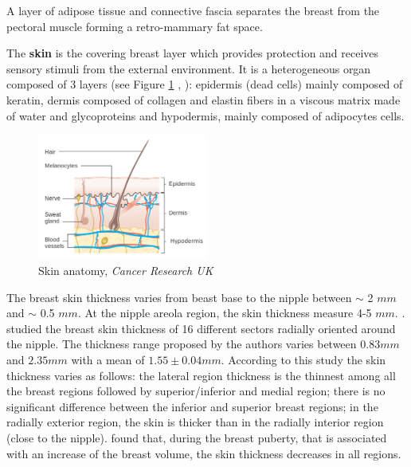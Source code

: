  A layer of adipose tissue and connective fascia separates the breast from the pectoral muscle forming a retro-mammary fat space.
 
The \textbf{skin} is the covering breast layer which provides protection and receives sensory stimuli from the external environment. It is a heterogeneous organ composed of 3 layers (see Figure \ref{fig:skinanatomy} , \citep{kanitakis2002anatomy} ): epidermis (dead cells) mainly composed of keratin, dermis composed of collagen and elastin fibers in a viscous matrix made of water and glycoproteins and hypodermis, mainly composed of adipocytes cells.


\begin{figure}[!h]
\centering
\centerline{\includegraphics[width=0.5\textwidth,keepaspectratio]{figures/skin_2.jpg} }
\caption{Skin anatomy, \textit{Cancer Research UK}}
\label{fig:skinanatomy}
\end{figure}



The breast skin thickness varies from beast base to the nipple between $\sim$ 2 $mm$ and $\sim$ 0.5 $mm$. At the nipple areola region, the skin thickness measure 4-5 $mm$.
 \citep{andolina2011mammographic}. \cite{sutradhar_vivo_2013} studied the breast skin thickness of 16 different sectors radially oriented around the nipple. The thickness range proposed by the authors varies between $0.83 mm$ and $2.35 mm$ with a mean of $1.55 \pm 0.04 mm$. According to this study the skin thickness varies as follows: the lateral
region thickness is the thinnest among all the breast regions followed by superior/inferior and medial region; there is no significant difference between the inferior and superior breast regions; in the radially exterior region, the skin is thicker than in the radially interior region (close to the nipple).  \cite{ulger2003effect} found that, during the breast puberty, that is associated with an increase of the breast volume, the skin thickness decreases in all regions.


